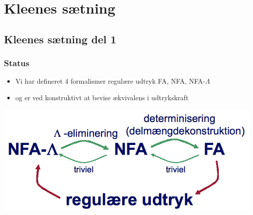 \section{Kleenes sætning}
\subsection{Kleenes sætning del 1}
\begin{frame}
\frametitle{Status}
\begin{itemize}[<+->]
\item Vi har defineret 4 formalismer
regulære udtryk
FA,
NFA,
NFA-$\Lambda$
\item og er ved konstruktivt at bevise ækvivalens i udtrykskraft
\end{itemize}
\includegraphics[scale=0.4]{images/2_seminar_equiv}
\end{frame}

